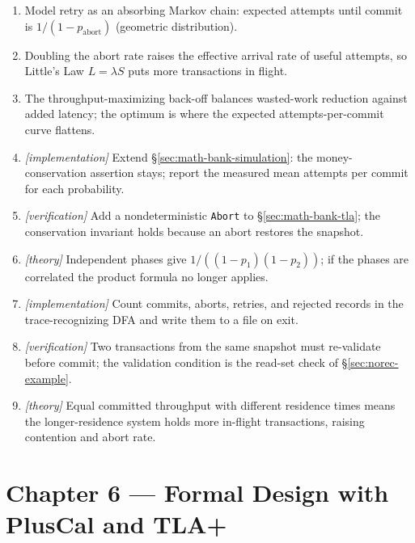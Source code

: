 \begin{enumerate}
    \item Model retry as an absorbing Markov chain: expected attempts until
          commit is $1/(1-p_{\mathrm{abort}})$ (geometric distribution).
    \item Doubling the abort rate raises the effective arrival rate of
          useful attempts, so Little's Law $L=\lambda S$ puts more
          transactions in flight.
    \item The throughput-maximizing back-off balances wasted-work reduction
          against added latency; the optimum is where the expected
          attempts-per-commit curve flattens.
    \item \emph{[implementation]} Extend \S\ref{sec:math-bank-simulation}:
          the money-conservation assertion stays; report the measured mean
          attempts per commit for each probability.
    \item \emph{[verification]} Add a nondeterministic \texttt{Abort} to
          \S\ref{sec:math-bank-tla}; the conservation invariant holds
          because an abort restores the snapshot.
    \item \emph{[theory]} Independent phases give
          $1/((1-p_1)(1-p_2))$; if the phases are correlated the product
          formula no longer applies.
    \item \emph{[implementation]} Count commits, aborts, retries, and
          rejected records in the trace-recognizing DFA and write them to a
          file on exit.
    \item \emph{[verification]} Two transactions from the same snapshot must
          re-validate before commit; the validation condition is the
          read-set check of \S\ref{sec:norec-example}.
    \item \emph{[theory]} Equal committed throughput with different residence
          times means the longer-residence system holds more in-flight
          transactions, raising contention and abort rate.
\end{enumerate}

\section*{Chapter 6 --- Formal Design with PlusCal and TLA+}

